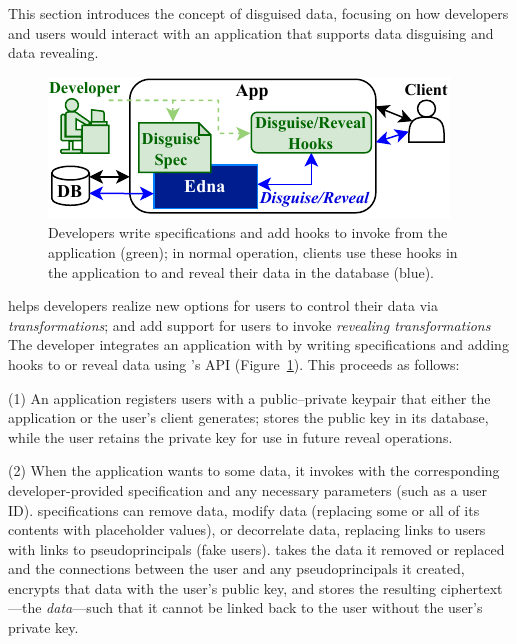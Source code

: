 This section introduces the concept of disguised data, focusing on how
developers and users would interact with an application that supports 
data disguising and data revealing.
%

\begin{figure}[h!]
  \centering
    \includegraphics{figs/edna_overview}
    \caption{Developers write \xx specifications and add hooks to invoke \sys
        from the application (green); in normal operation, clients use these
        hooks in the application to \xx and reveal their data in the database
        (blue).
    }
  \label{f:edna-overview}
\end{figure}
%
\sys helps developers realize new options for users to control their data
via \emph{\xxing transformations}; and add support for users to invoke
\emph{revealing transformations}
%
The developer integrates an application with \sys by writing \xx specifications
and adding hooks to \xx or reveal data using \sys's API
(Figure~\ref{f:edna-overview}).
%
This proceeds as follows:
%

%
(1) An application registers users with a public--private keypair
that either the application or the user's client generates; \sys stores the
public key in its database, while the user retains the private key for use in
future reveal operations.
%

%
(2) When the application wants to \xx some data, it invokes \sys with the
corresponding developer-provided \xx specification and any necessary
parameters (such as a user ID).
%
\Xx specifications can remove data, modify data (replacing some or all of its
contents with placeholder values), or decorrelate data, replacing
links to users with links to pseudoprincipals (fake users).
%
%
\sys takes the data it removed or replaced and the connections between
the user and any pseudoprincipals it created, encrypts that data with the user's
public key, and stores the resulting ciphertext---the \emph{\xxed
data}---such that it cannot be linked back to the user without the user's
private key.
%
%

